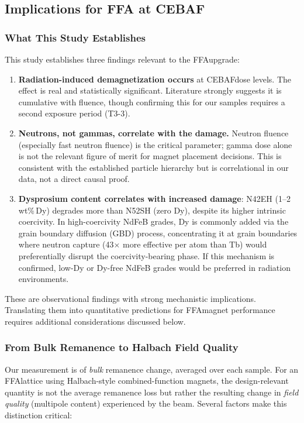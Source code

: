 \documentclass[11pt,letterpaper]{article}
\newcommand{\CEBAF}{CEBAF}
\newcommand{\FFA}{FFA}
\begin{document}
\subsection{Implications for FFA at CEBAF}

\subsubsection{What This Study Establishes}

This study establishes three findings relevant to the \FFA upgrade:
\begin{enumerate}
    \item \textbf{Radiation-induced demagnetization occurs} at \CEBAF dose
    levels. The effect is real and statistically significant. Literature
    strongly suggests it is cumulative with fluence, though confirming this
    for our samples requires a second exposure period (T3-3).
    \item \textbf{Neutrons, not gammas, correlate with the damage.} Neutron
    fluence (especially fast neutron fluence) is the critical parameter;
    gamma dose alone is not the relevant figure of merit for magnet placement
    decisions. This is consistent with the established particle hierarchy
    but is correlational in our data, not a direct causal proof.
    \item \textbf{Dysprosium content correlates with increased damage}:
    N42EH (1--2\,wt\%\,Dy) degrades more than N52SH (zero Dy), despite its
    higher intrinsic coercivity. In high-coercivity NdFeB grades, Dy is
    commonly added via the grain boundary diffusion (GBD) process,
    concentrating it at grain boundaries where neutron capture
    (43$\times$ more effective per atom than Tb) would preferentially
    disrupt the coercivity-bearing phase. If this mechanism is confirmed,
    low-Dy or Dy-free NdFeB grades would be preferred in radiation
    environments.
\end{enumerate}

These are observational findings with strong mechanistic implications.
Translating them into quantitative
predictions for \FFA magnet performance requires additional considerations
discussed below.

\subsubsection{From Bulk Remanence to Halbach Field Quality}

Our measurement is of \emph{bulk} remanence change, averaged over each
sample. For an \FFA lattice using Halbach-style combined-function magnets,
the design-relevant quantity is not the average remanence loss but rather
the resulting change in \emph{field quality} (multipole content) experienced
by the beam. Several factors make this distinction critical:
\end{document}
